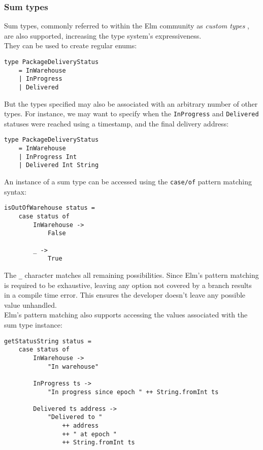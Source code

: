 \subsubsection{Sum types}
Sum types, commonly referred to within the Elm community as \textit{custom types} \cite{noauthor_custom_nodate}, are also supported, increasing the type system's expressiveness.\\

They can be used to create regular enums:
\begin{verbatim}
type PackageDeliveryStatus
    = InWarehouse
    | InProgress
    | Delivered
\end{verbatim}

But the types specified may also be associated with an arbitrary number of other types. For instance, we may want to specify when the \texttt{InProgress} and \texttt{Delivered} statuses were reached using a timestamp, and the final delivery address:
\begin{verbatim}
type PackageDeliveryStatus
    = InWarehouse
    | InProgress Int
    | Delivered Int String
\end{verbatim}

An instance of a sum type can be accessed using the \texttt{case/of} pattern matching syntax:
\begin{verbatim}
isOutOfWarehouse status =
    case status of
        InWarehouse ->
            False

        _ ->
            True
\end{verbatim}

The \texttt{\_} character matches all remaining possibilities. Since Elm's pattern matching is required to be exhaustive, leaving any option not covered by a branch results in a compile time error. This ensures the developer doesn't leave any possible value unhandled.\\

Elm's pattern matching also supports accessing the values associated with the sum type instance:
\begin{verbatim}
getStatusString status =
    case status of
        InWarehouse ->
            "In warehouse"

        InProgress ts ->
            "In progress since epoch " ++ String.fromInt ts

        Delivered ts address ->
            "Delivered to "
                ++ address
                ++ " at epoch "
                ++ String.fromInt ts
\end{verbatim}

